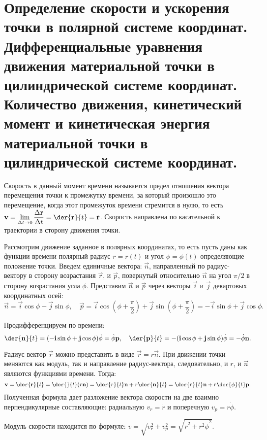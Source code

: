 \chapter{Определение скорости и ускорения точки в полярной системе координат.
Дифференциальные уравнения движения материальной точки в цилиндрической
системе координат. Количество движения, кинетический момент и кинетическая
энергия материальной точки в цилиндрической системе координат.}

Скорость в данный момент времени называется предел отношения вектора перемещения
точки к промежутку времени, за который произошло это перемещение, когда этот
промежуток времени стремится в нулю, то есть \( \ds \vec{v} = \lim_{\D t\to 0}
\Der{\vec{r}}{t} = \der{\vec{r}}{t} = \dot{\vec{r}} \). Скорость направлена по
касательной к траектории в сторону движения точки.

Рассмотрим движение заданное в полярных координатах, то есть пусть даны как
функции времени полярный радиус \( r = r(t) \) и угол \( \phi = \phi (t) \)
определяющие положение точки. Введем единичные вектора: \( \vec{n} \),
направленный по радиус-вектору в сторону возрастания \( \vec{r} \), и
\( \vec{p} \), повернутый относительно \( \vec{n} \) на угол \( \pi/2 \) в
сторону возрастания угла \( \phi \). Представим \( \vec{n} \) и \( \vec{p} \)
через векторы \( \vec{i} \) и \( \vec{j} \) декартовых координатных осей:
\[
    \vec{n} = \vec{i}\cos\phi + \vec{j}\sin\phi, \quad
    \vec{p} = \vec{i}\cos\left(\phi + \frac{\pi}{2}\right) + \vec{j}\sin\left(
    \phi + \frac{\pi}{2}\right) = -\vec{i}\sin\phi + \vec{j}\cos\phi.
\]

Продифференцируем по времени:
\[
    \der{\vec{n}}{t} = (-\vec{i}\sin\phi + \vec{j}\cos\phi)\dot{\phi} =
    \dot{\phi}\vec{p}, \quad \der{\vec{p}}{t} = -(\vec{i}\cos\phi +
    \vec{j}\sin\phi)\dot{\phi} = -\dot{\phi}\vec{n}.
\]

Радиус-вектор \( \vec{r} \) можно представить в виде \( \vec{r} = r\vec{n} \).
При движении точки меняются как модуль, так и направление радиус-вектора,
следовательно, и \( r \), и \( \vec{n} \) являются функциями времени. Тогда:
\[
    \vec{v} = \der{\vec{r}}{t} = \der{}{t}(r\vec{n}) = \der{r}{t}\vec{n} +
    r\der{\vec{n}}{t} = \der{r}{t}\vec{n} + r\der{\phi}{t}\vec{p}.
\]
Полученная формула дает разложение вектора скорости на две взаимно
перпендикулярные составляющие: радиальную \( v_r = \dot{r} \) и поперечную
\( v_p = r\dot{\phi} \).

Модуль скорости находится по формуле: \( v = \sqrt{v_r^2 + v_p^2} =
\sqrt{\dot{r}^2 + r^2\dot{\phi}^2} \).

